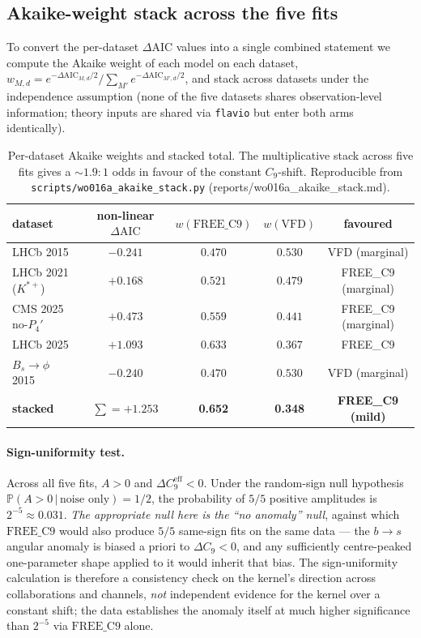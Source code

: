 \subsection{Akaike-weight stack across the five fits}

To convert the per-dataset $\Delta\mathrm{AIC}$ values into a single
combined statement we compute the Akaike weight of each model on each
dataset, $w_{M,d} = e^{-\Delta\mathrm{AIC}_{M,d}/2} / \sum_{M'}
e^{-\Delta\mathrm{AIC}_{M',d}/2}$, and stack across datasets under the
independence assumption (none of the five datasets shares
observation-level information; theory inputs are shared via
\texttt{flavio} but enter both arms identically).

\begin{table}[h]
\centering
\small
\begin{tabular}{lcccc}
\toprule
dataset & non-linear $\Delta\mathrm{AIC}$ &
          $w(\mathrm{FREE\_C9})$ & $w(\mathrm{VFD})$ & favoured \\
\midrule
LHCb 2015                  & $-0.241$ & $0.470$ & $0.530$ & VFD (marginal) \\
LHCb 2021 ($K^{*+}$)       & $+0.168$ & $0.521$ & $0.479$ & FREE\_C9 (marginal) \\
CMS 2025 no-$P_{4}'$       & $+0.473$ & $0.559$ & $0.441$ & FREE\_C9 (marginal) \\
LHCb 2025                  & $+1.093$ & $0.633$ & $0.367$ & FREE\_C9 \\
$B_{s}\!\to\!\phi$ 2015    & $-0.240$ & $0.470$ & $0.530$ & VFD (marginal) \\
\midrule
\textbf{stacked}            & $\sum=+1.253$ &
\textbf{0.652} & \textbf{0.348} & \textbf{FREE\_C9 (mild)} \\
\bottomrule
\end{tabular}
\caption{Per-dataset Akaike weights and stacked total. The
multiplicative stack across five fits gives a $\sim 1.9{:}1$ odds in
favour of the constant $C_{9}$-shift. Reproducible from
\texttt{scripts/wo016a\_akaike\_stack.py}
(reports/wo016a\_akaike\_stack.md).}
\label{tab:akaike_stack}
\end{table}

\paragraph{Sign-uniformity test.} Across all five fits, $A>0$ and
$\Delta C_{9}^{\mathrm{eff}}<0$. Under the random-sign null hypothesis
$\mathbb{P}(A>0\,|\,\text{noise only}) = 1/2$, the probability of
$5/5$ positive amplitudes is $2^{-5}\approx 0.031$. \emph{The
appropriate null here is the ``no anomaly'' null}, against which
$\mathrm{FREE\_C9}$ would also produce $5/5$ same-sign fits on the
same data — the $b\to s$ angular anomaly is biased a priori to
$\Delta C_{9}<0$, and any sufficiently centre-peaked one-parameter
shape applied to it would inherit that bias. The sign-uniformity
calculation is therefore a consistency check on the kernel's
direction across collaborations and channels, \emph{not} independent
evidence for the kernel over a constant shift; the data establishes
the anomaly itself at much higher significance than $2^{-5}$ via
$\mathrm{FREE\_C9}$ alone.

